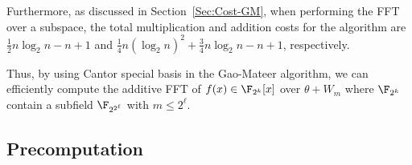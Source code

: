 
Furthermore, as discussed in Section~\ref{Sec:Cost-GM}, when performing the FFT over a subspace, the total multiplication and addition costs for the algorithm are $\frac{1}{2}n\log_2n - n+1$ and $\frac{1}{4}n(\log_2n)^2 + \frac{3}{4}n\log_2n - n +1$, respectively.

Thus, by using Cantor special basis in the Gao-Mateer algorithm, we can efficiently compute the additive FFT of $f(x)\in \F_{2^k}[x]$ over $\theta + W_m$ where $\F_{2^k}$ contain a subfield $\F_{2^{2^\ell}}$ with $m \leq 2^{\ell}$.




\subsection{Precomputation}\label{sec:gao-precmp}

